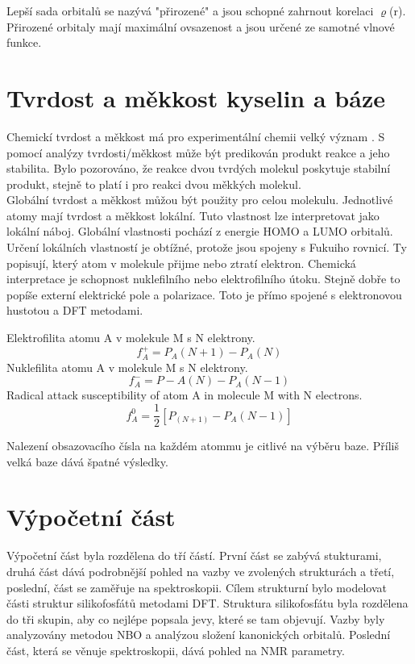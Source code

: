 \documentclass[
  digital, %
  table,   %
  lof,     %
  lot,     %
]{fithesis3}
\begin{document}
Lepší sada orbitalů se nazývá "přirozené" a jsou schopné zahrnout korelaci $\varrho$(r). Přirozené orbitaly mají maximální ovsazenost a jsou určené ze samotné vlnové funkce.

\section{Tvrdost a měkkost kyselin a báze}
Chemickí tvrdost a měkkost má pro experimentální chemii velký význam . S pomocí analýzy tvrdosti/měkkost může být predikován produkt reakce a jeho stabilita. Bylo pozorováno, že reakce dvou tvrdých molekul poskytuje stabilní produkt, stejně to platí i pro reakci dvou měkkých molekul. \\
Globální tvrdost a měkkost můžou být použity pro celou molekulu. Jednotlivé atomy mají tvrdost a měkkost lokální. Tuto vlastnost lze interpretovat jako lokální náboj. Globální vlastnosti pochází z energie HOMO a LUMO orbitalů. Určení lokálních vlastností je obtížné, protože jsou spojeny s Fukuiho rovnicí. Ty popisují, který atom v molekule přijme nebo ztratí elektron. Chemická interpretace je schopnost nuklefilního nebo elektrofilního útoku. Stejně dobře to popíše externí elektrické pole a polarizace. Toto je přímo spojené s elektronovou hustotou a DFT metodami.

Elektrofilita atomu A v molekule M s N elektrony.
\begin{equation}
f_A^+ = P_A(N+1) - P_A(N)
\end{equation}
Nuklefilita atomu A v molekule M s N elektrony.
\begin{equation}
f_A^- = P-A(N) - P_A(N-1)
\end{equation}
Radical attack susceptibility of atom A in molecule M with N electrons.
\begin{equation}
f_A^0 = \frac{1}{2}[P_(N+1) - P_A(N-1)]
\end{equation}

Nalezení obsazovacího čísla na každém atommu je citlivé na výběru baze. Příliš velká baze dává špatné výsledky.


\section{Výpočetní část}
Výpočetní část byla rozdělena do tří částí. První část se zabývá stukturami, druhá část dává podrobnější pohled na vazby ve zvolených strukturách a třetí, poslední, část se zaměřuje na spektroskopii.
Cílem strukturní bylo modelovat části struktur silikofosfátů metodami DFT. Struktura silikofosfátu byla rozdělena do tři skupin, aby co nejlépe popsala jevy, které se tam objevují. Vazby byly analyzovány metodou NBO a analýzou složení kanonických orbitalů. Poslední část, která se věnuje spektroskopii, dává pohled na NMR parametry.
\end{document}
